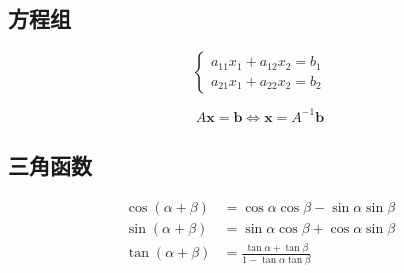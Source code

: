 \subsection{方程组}

\[
\begin{cases}
a_{11}x_1 + a_{12}x_2 = b_1 \\
a_{21}x_1 + a_{22}x_2 = b_2
\end{cases}
\]

\[
A\mathbf{x} = \mathbf{b} \iff \mathbf{x} = A^{-1}\mathbf{b}
\]

\subsection{三角函数}

\[
\begin{aligned}
\cos(\alpha + \beta) &= \cos\alpha \cos\beta - \sin\alpha \sin\beta \\
\sin(\alpha + \beta) &= \sin\alpha \cos\beta + \cos\alpha \sin\beta \\
\tan(\alpha + \beta) &= \frac{\tan\alpha + \tan\beta}{1 - \tan\alpha \tan\beta}
\end{aligned}
\]